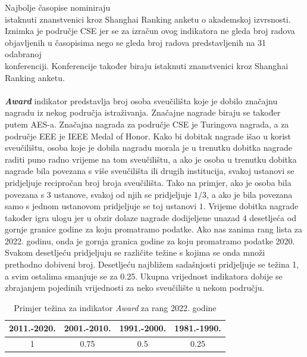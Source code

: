 \documentclass[times, utf8, zavrsni]{fer}
\begin{document}
Najbolje časopise nominiraju \\istaknuti znanstvenici kroz Shanghai Ranking anketu o akademskoj izvrsnosti. \\Iznimka je područje CSE 
jer se za izračun ovog indikatora ne gleda broj radova \\objavljenih u časopisima nego se gleda broj radova predstavljenih na 31 odabranoj \\konferenciji.
Konferencije također biraju istaknuti znanstvenici kroz Shanghai \\Ranking anketu.
\\ \\\textbf{\emph{Award}} indikator predstavlja broj osoba sveučilišta koje je dobilo značajnu nagradu iz nekog područja istraživanja. Značajne nagrade 
biraju se također putem AES-a. Značajna nagrada za područje CSE je Turingova 
nagrada, a za područje EEE je IEEE Medal of Honor.
Kako bi dobitak nagrade išao u korist sveučilištu, osoba koje je dobila nagradu morala je u trenutku dobitka nagrade raditi puno radno vrijeme na 
tom sveučilištu, a ako  je osoba u trenutku dobitka nagrade bila povezana s više sveučilišta ili drugih institucija, svakoj ustanovi se pridjeljuje
recipročan broj broja sveučilišta. Tako na primjer, ako je osoba bila povezana s 3 ustanove, svakoj od njih se pridjeljuje $1/3$, a ako je bila 
povezana samo s jednom ustanovom pridjeljuje se toj ustanovi $1$. 
Vrijeme dobitka nagrade također igra ulogu jer u obzir dolaze nagrade dodijeljene unazad 4 desetljeća od gornje granice godine za koju promatramo podatke.
Ako nas zanima rang lista za 2022. godinu, onda je gornja granica godine za koju promatramo podatke 2020. Svakom desetljeću pridjeljuju se različite težine 
s kojima se onda množi \\prethodno dobiveni broj. Desetljeću najbližem sadašnjosti pridjeljuje se težina 1, a svim ostalima smanjuje se za 0.25.
Ukupna vrijednost indikatora dobije se zbrajanjem pojedinih vrijednosti za neko sveučilište u nekom području.

\begin{table}[htb]
    \caption{Primjer težina za indikator \emph{Award} za rang 2022. godine}
        \label{tbl:konstante2}
        \centering
        \begin{tabular}{cccc} \hline
        2011.-2020. & 2001.-2010. & 1991.-2000. & 1981.-1990.\\ \hline
        1&0.75&0.5&0.25\\
        \end{tabular}
        \end{table}    
        \FloatBarrier
\end{document}

